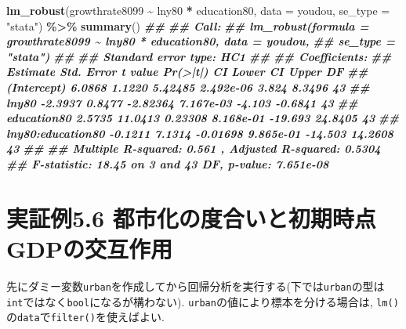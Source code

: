 \documentclass[
]{book}
\newenvironment{Shaded}{\begin{snugshade}}{\end{snugshade}}
\newcommand{\AttributeTok}[1]{\textcolor[rgb]{0.13,0.29,0.53}{#1}}
\newcommand{\DocumentationTok}[1]{\textcolor[rgb]{0.56,0.35,0.01}{\textbf{\textit{#1}}}}
\newcommand{\FunctionTok}[1]{\textcolor[rgb]{0.13,0.29,0.53}{\textbf{#1}}}
\newcommand{\NormalTok}[1]{#1}
\newcommand{\SpecialCharTok}[1]{\textcolor[rgb]{0.81,0.36,0.00}{\textbf{#1}}}
\newcommand{\StringTok}[1]{\textcolor[rgb]{0.31,0.60,0.02}{#1}}
\begin{document}
\begin{Shaded}
\begin{Highlighting}[]
\FunctionTok{lm\_robust}\NormalTok{(growthrate8099 }\SpecialCharTok{\textasciitilde{}}\NormalTok{ lny80 }\SpecialCharTok{*}\NormalTok{ education80, }\AttributeTok{data =}\NormalTok{ youdou, }\AttributeTok{se\_type =} \StringTok{"stata"}\NormalTok{) }\SpecialCharTok{\%\textgreater{}\%} \FunctionTok{summary}\NormalTok{()}
\DocumentationTok{\#\# }
\DocumentationTok{\#\# Call:}
\DocumentationTok{\#\# lm\_robust(formula = growthrate8099 \textasciitilde{} lny80 * education80, data = youdou, }
\DocumentationTok{\#\#     se\_type = "stata")}
\DocumentationTok{\#\# }
\DocumentationTok{\#\# Standard error type:  HC1 }
\DocumentationTok{\#\# }
\DocumentationTok{\#\# Coefficients:}
\DocumentationTok{\#\#                   Estimate Std. Error  t value  Pr(\textgreater{}|t|) CI Lower CI Upper DF}
\DocumentationTok{\#\# (Intercept)         6.0868     1.1220  5.42485 2.492e{-}06    3.824   8.3496 43}
\DocumentationTok{\#\# lny80              {-}2.3937     0.8477 {-}2.82364 7.167e{-}03   {-}4.103  {-}0.6841 43}
\DocumentationTok{\#\# education80         2.5735    11.0413  0.23308 8.168e{-}01  {-}19.693  24.8405 43}
\DocumentationTok{\#\# lny80:education80  {-}0.1211     7.1314 {-}0.01698 9.865e{-}01  {-}14.503  14.2608 43}
\DocumentationTok{\#\# }
\DocumentationTok{\#\# Multiple R{-}squared:  0.561 , Adjusted R{-}squared:  0.5304 }
\DocumentationTok{\#\# F{-}statistic: 18.45 on 3 and 43 DF,  p{-}value: 7.651e{-}08}
\end{Highlighting}
\end{Shaded}

\hypertarget{ux5b9fux8a3cux4f8b5.6-ux90fdux5e02ux5316ux306eux5ea6ux5408ux3044ux3068ux521dux671fux6642ux70b9gdpux306eux4ea4ux4e92ux4f5cux7528}{%
\section*{実証例5.6 都市化の度合いと初期時点GDPの交互作用}\label{ux5b9fux8a3cux4f8b5.6-ux90fdux5e02ux5316ux306eux5ea6ux5408ux3044ux3068ux521dux671fux6642ux70b9gdpux306eux4ea4ux4e92ux4f5cux7528}}

先にダミー変数\texttt{urban}を作成してから回帰分析を実行する(下では\texttt{urban}の型は\texttt{int}ではなく\texttt{bool}になるが構わない). \texttt{urban}の値により標本を分ける場合は, \texttt{lm()}の\texttt{data}で\texttt{filter()}を使えばよい.
\end{document}
